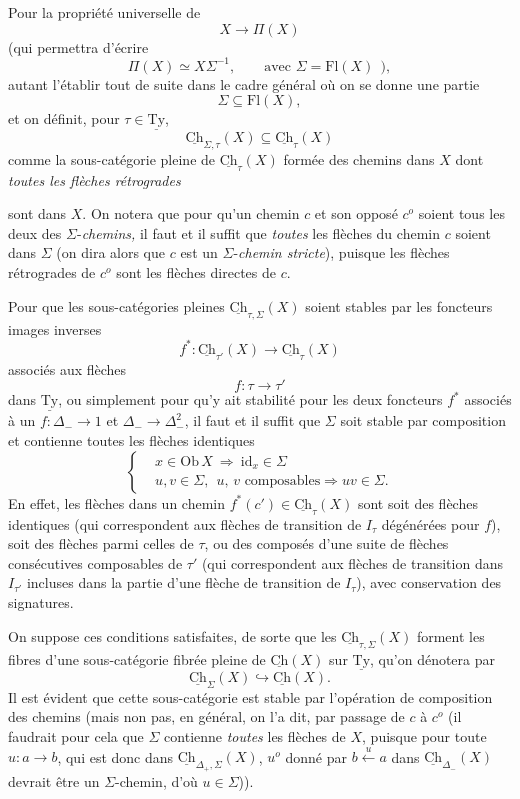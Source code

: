 \documentclass[11pt]{article}
\newcommand{\printedpage}[1]{\marginpar{\footnotesize p.~#1}}
\newcommand{\msp}[1]{\marginpar{\vspace*{10pt}\footnotesize [#1]}}
\newcommand{\uTy}{\underline{\mathrm{Ty}}}
\newcommand{\Ch}{\underline{\mathrm{Ch}}}
\newcommand{\Ty}{\underline{\mathrm{Ty}}}
\newcommand{\Fl}{\mathrm{Fl}}
\newcommand{\id}{\mathrm{id}}
\begin{document}
Pour la propriété universelle de
\[
X \longrightarrow \Pi(X)
\]
(qui permettra d'écrire
\[
\Pi(X) \simeq X\Sigma^{-1}, \qquad \text{avec } \Sigma = \Fl(X) \ \ ),
\]
autant l'établir tout de suite dans le cadre général où on se donne une partie
\[
\Sigma \subseteq \Fl(X),
\]
et on définit, pour $\tau \in \Ty$,
\[
\Ch_{\Sigma,\tau}(X) \subseteq \Ch_{\tau}(X)
\]
comme la sous-catégorie pleine de $\Ch_{\tau}(X)$ formée des chemins dans $X$ dont \textit{toutes les flèches rétrogrades}

\msp{page 66}

sont dans $X$. On notera que pour qu'un chemin $c$ et son opposé $c^o$ soient tous les deux des $\Sigma$-\textit{chemins,} il faut et il suffit que \textit{toutes} les flèches du chemin $c$ soient dans $\Sigma$ (on dira alors que $c$ est un $\Sigma$-\textit{chemin stricte}), puisque les flèches rétrogrades de $c^o$ sont les flèches directes de $c$.

Pour que les sous-catégories pleines $\Ch_{\tau,\Sigma}(X)$ soient stables par les foncteurs images inverses
\[
f^* : \Ch_{\tau'}(X) \longrightarrow \Ch_{\tau}(X)
\]
associés aux flèches
\[
f : \tau \longrightarrow \tau'
\]
dans $\uTy$, ou simplement pour qu'y ait stabilité pour les deux foncteurs $f^*$ associés à un $f : \Delta_- \longrightarrow 1$ et $\Delta_- \longrightarrow \Delta_-^2$, il faut et il suffit que $\Sigma$ soit stable par composition et contienne toutes les flèches identiques %
\[
\left\{
\begin{aligned}
& x \in \mathrm{Ob}\,X \ \Longrightarrow \ \id_x \in \Sigma \\
& u, v \in \Sigma, \ \ u,\, v \text{ composables} \Longrightarrow uv \in \Sigma.
\end{aligned}
\right.
\]
En effet, les flèches dans un chemin $f^*(c') \in \Ch_{\tau}(X)$ sont soit des flèches identiques (qui correspondent aux flèches de transition de $I_\tau$ dégénérées pour $f$), soit des flèches parmi celles de $\tau$, ou des composés d'une suite de flèches consécutives composables de $\tau'$ (qui correspondent aux flèches de transition dans $I_{\tau'}$ incluses dans la partie d'une flèche de transition de $I_\tau$), avec conservation des signatures.

\printedpage{45}

\msp{page 67}

On suppose ces conditions satisfaites, de sorte que les $\Ch_{\tau,\Sigma}(X)$ forment les fibres d'une sous-catégorie fibrée pleine de $\Ch(X)$ sur $\uTy$, qu'on dénotera par
\[
\Ch_{\Sigma}(X) \hookrightarrow \Ch(X).
\]
Il est évident que cette sous-catégorie est stable par l'opération de composition des chemins (mais non pas, en général, on l'a dit, par passage de $c$ à $c^o$ (il faudrait pour cela que $\Sigma$ contienne \textit{toutes} les flèches de $X$, puisque pour toute $u : a \longrightarrow b$, qui est donc dans $\Ch_{\Delta_+,\Sigma}(X)$, $u^o$ donné par $b \xleftarrow{\ u\ } a$ dans $\Ch_{\Delta_-}(X)$ devrait être un $\Sigma$-chemin, d'où $u \in \Sigma$)).
\end{document}
